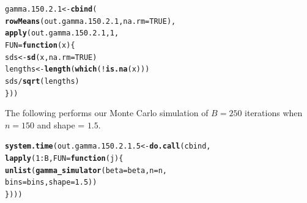\documentclass[11pt]{article}\usepackage[]{graphicx}\usepackage[]{color}
\makeatletter
\newcommand{\hlnum}[1]{\textcolor[rgb]{0.686,0.059,0.569}{#1}}%
\newcommand{\hlopt}[1]{\textcolor[rgb]{0,0,0}{#1}}%
\newcommand{\hlstd}[1]{\textcolor[rgb]{0.345,0.345,0.345}{#1}}%
\newcommand{\hlkwa}[1]{\textcolor[rgb]{0.161,0.373,0.58}{\textbf{#1}}}%
\newcommand{\hlkwb}[1]{\textcolor[rgb]{0.69,0.353,0.396}{#1}}%
\newcommand{\hlkwc}[1]{\textcolor[rgb]{0.333,0.667,0.333}{#1}}%
\newcommand{\hlkwd}[1]{\textcolor[rgb]{0.737,0.353,0.396}{\textbf{#1}}}%
\newenvironment{kframe}{%
 \def\at@end@of@kframe{}%
 \ifinner\ifhmode%
  \def\at@end@of@kframe{\end{minipage}}%
  \begin{minipage}{\columnwidth}%
 \fi\fi%
 \def\FrameCommand##1{\hskip\@totalleftmargin \hskip-\fboxsep
 \colorbox{shadecolor}{##1}\hskip-\fboxsep
     \hskip-\linewidth \hskip-\@totalleftmargin \hskip\columnwidth}%
 \MakeFramed {\advance\hsize-\width
   \@totalleftmargin\z@ \linewidth\hsize
   \@setminipage}}%
 {\par\unskip\endMakeFramed%
 \at@end@of@kframe}
\newenvironment{knitrout}{}{} %
\makeatother
\begin{document}
\begin{knitrout}
\color{fgcolor}\begin{kframe}
\begin{alltt}
\hlstd{gamma.150.2.1} \hlkwb{<-} \hlkwd{cbind}\hlstd{(}
  \hlkwd{rowMeans}\hlstd{(out.gamma.150.2.1,} \hlkwc{na.rm} \hlstd{=} \hlnum{TRUE}\hlstd{),}
  \hlkwd{apply}\hlstd{(out.gamma.150.2.1,} \hlnum{1}\hlstd{,}
  \hlkwc{FUN} \hlstd{=} \hlkwa{function}\hlstd{(}\hlkwc{x}\hlstd{)\{}
    \hlstd{sds} \hlkwb{<-} \hlkwd{sd}\hlstd{(x,} \hlkwc{na.rm} \hlstd{=} \hlnum{TRUE}\hlstd{)}
    \hlstd{lengths} \hlkwb{<-} \hlkwd{length}\hlstd{(}\hlkwd{which}\hlstd{(}\hlopt{!}\hlkwd{is.na}\hlstd{(x)))}
    \hlstd{sds} \hlopt{/} \hlkwd{sqrt}\hlstd{(lengths)}
  \hlstd{\}))}
\end{alltt}


{\ttfamily\noindent\bfseries\color{errorcolor}{\#\# Error in is.data.frame(x): object 'out.gamma.150.2.1' not found}}\end{kframe}
\end{knitrout}

The following performs our Monte Carlo simulation of $B = 250$ iterations 
when $n = 150$ and shape = $1.5$.

\begin{knitrout}
\color{fgcolor}\begin{kframe}
\begin{alltt}
\hlkwd{system.time}\hlstd{(out.gamma.150.2.1.5} \hlkwb{<-} \hlkwd{do.call}\hlstd{(cbind,}
  \hlkwd{lapply}\hlstd{(}\hlnum{1}\hlopt{:}\hlstd{B,} \hlkwc{FUN} \hlstd{=} \hlkwa{function}\hlstd{(}\hlkwc{j}\hlstd{)\{}
    \hlkwd{unlist}\hlstd{(}\hlkwd{gamma_simulator}\hlstd{(}\hlkwc{beta} \hlstd{= beta,} \hlkwc{n} \hlstd{= n,}
      \hlkwc{bins} \hlstd{= bins,} \hlkwc{shape} \hlstd{=} \hlnum{1.5}\hlstd{))}
\hlstd{\})))}
\end{alltt}


{\ttfamily\noindent\bfseries\color{errorcolor}{\#\# Error in eval(predvars, data, env): object 'x1' not found}}

{\ttfamily\noindent\itshape\color{messagecolor}{\#\# Timing stopped at: 0.002 0 0.002}}\end{kframe}
\end{knitrout}
\end{document}
